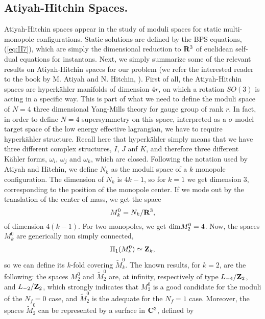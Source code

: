 \subsection{Atiyah-Hitchin Spaces.}

Atiyah-Hitchin spaces appear in the study of moduli spaces for
static multi-monopole configurations. Static solutions are
defined by the BPS equations, (\ref{eq:II7}), which 
are simply the dimensional
reduction to ${\bf R}^3$ of euclidean self-dual
equations for instantons. Next, we simply summarize some of the
relevant results on Atiyah-Hitchin spaces for our problem (we
refer the interested reader to the book by M. Atiyah and N. Hitchin, 
\cite{AH}). First of all, the Atiyah-Hitchin spaces are
hyperk\"{a}hler manifolds of dimension $4r$, on which a rotation
$SO(3)$ is acting in a specific way. This is part of what we need
to define the moduli space of $N\!=\!4$ three dimensional
Yang-Mills theory for gauge group of rank $r$. In fact, in order to
define $N\!=\!4$ supersymmetry on this space, interpreted as a
$\sigma$-model target space of the low energy effective
lagrangian, we have to require hyperk\"{a}hler structure. Recall
here that hyperk\"{a}hler simply means that we have three
different complex structures, $I$, $J$ anf $K$, and therefore
three different K\"{a}hler forms, $\omega_i$, $\omega_j$ and
$\omega_k$, which are closed. Following the notation used by
Atiyah and Hitchin, we define $N_k$ as the moduli space of a $k$
monopole configuration. The dimension of $N_k$ is $4k-1$, so for
$k=1$ we get dimension $3$, corresponding to the position of the
monopole center. If we mode out by the translation of the center
of mass, we get the space
\begin{equation}
M_k^0 = N_k/{\bf R}^3,
\label{eq:II57}
\end{equation}
of dimension $4(k-1)$. For two monopoles, we get $\hbox {dim}
M_2^0=4$. Now, the spaces $M_k^0$ are generically non simply
connected,
\begin{equation}
\Pi_1(M_k^0) \simeq {\bf Z}_k,
\label{eq:II56}
\end{equation}
so we can define its $k$-fold covering $\tilde{M}_k^0$. The known
results, for $k=2$, are the following: the spaces $M_2^0$ and
$\tilde{M}_2^0$ are, at infinity, respectively of type
$L_{-4}/{\bf Z}_2$, and $L_{-2}/{\bf Z}_2$, which strongly
indicates that $M_2^0$ is a good candidate for the moduli of the
$N_f=0$ case, and $\tilde{M}_2^0$ is the adequate for the
$N_f=1$ case. Moreover, the spaces $\tilde{M}_2^0$ can be
represented by a surface in ${\bf C}^3$, defined by
